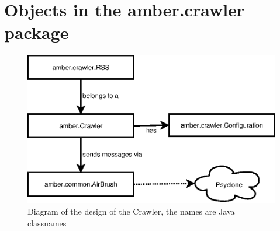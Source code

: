 \section{Objects in the amber.crawler package}


\begin{classmetadata}
\end{classmetadata}

\begin{interface}
\end{interface}




\begin{classmetadata}
\end{classmetadata}

\begin{interface}
\end{interface}



\begin{figure}
  \centering
  \includegraphics{image/crawler}
  \caption{
    Diagram of the design of the Crawler, the names are Java classnames
  }
\end{figure}

